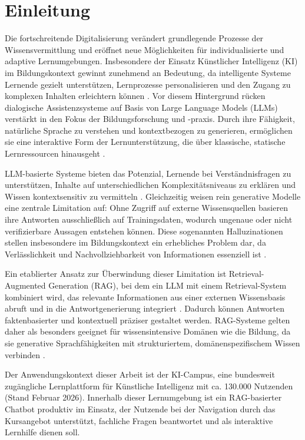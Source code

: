 \chapter{Einleitung}

Die fortschreitende Digitalisierung verändert grundlegende Prozesse der Wissensvermittlung und eröffnet neue Möglichkeiten für individualisierte und adaptive Lernumgebungen. Insbesondere der Einsatz Künstlicher Intelligenz (KI) im Bildungskontext gewinnt zunehmend an Bedeutung, da intelligente Systeme Lernende gezielt unterstützen, Lernprozesse personalisieren und den Zugang zu komplexen Inhalten erleichtern können \cite{ZawackiRichter2019}. Vor diesem Hintergrund rücken dialogische Assistenzsysteme auf Basis von Large Language Models (LLMs) verstärkt in den Fokus der Bildungsforschung und -praxis. Durch ihre Fähigkeit, natürliche Sprache zu verstehen und kontextbezogen zu generieren, ermöglichen sie eine interaktive Form der Lernunterstützung, die über klassische, statische Lernressourcen hinausgeht \cite{Neumann2024LLMHE}.

LLM-basierte Systeme bieten das Potenzial, Lernende bei Verständnisfragen zu unterstützen, Inhalte auf unterschiedlichen Komplexitätsniveaus zu erklären und Wissen kontextsensitiv zu vermitteln \cite{Neumann2024LLMHE,OatesJohnson2024}. Gleichzeitig weisen rein generative Modelle eine zentrale Limitation auf: Ohne Zugriff auf externe Wissensquellen basieren ihre Antworten ausschließlich auf Trainingsdaten, wodurch ungenaue oder nicht verifizierbare Aussagen entstehen können. Diese sogenannten Halluzinationen stellen insbesondere im Bildungskontext ein erhebliches Problem dar, da Verlässlichkeit und Nachvollziehbarkeit von Informationen essenziell ist \cite{Niu2024RAGTruth,Yu2024RAGEvalSurvey}.

Ein etablierter Ansatz zur Überwindung dieser Limitation ist Retrieval-Augmented Generation (RAG), bei dem ein LLM mit einem Retrieval-System kombiniert wird, das relevante Informationen aus einer externen Wissensbasis abruft und in die Antwortgenerierung integriert \cite{Lewis2021RAG}. Dadurch können Antworten faktenbasierter und kontextuell präziser gestaltet werden. RAG-Systeme gelten daher als besonders geeignet für wissensintensive Domänen wie die Bildung, da sie generative Sprachfähigkeiten mit strukturiertem, domänenspezifischem Wissen verbinden \cite{Lewis2021RAG,SwachaGracel2025}.

Der Anwendungskontext dieser Arbeit ist der KI-Campus, eine bundesweit zugängliche Lernplattform für Künstliche Intelligenz mit ca. 130.000 Nutzenden (Stand Februar 2026). Innerhalb dieser Lernumgebung ist ein RAG-basierter Chatbot produktiv im Einsatz, der Nutzende bei der Navigation durch das Kursangebot unterstützt, fachliche Fragen beantwortet und als interaktive Lernhilfe dienen soll.

